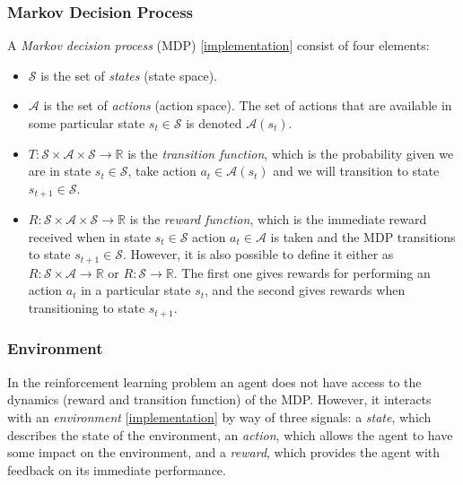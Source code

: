 \documentclass{article}
\newcommand{\GithubURL}[1]{[\href{https://github.com/davidrobles/mlnd-capstone-code/blob/master/#1}{implementation}]}
\begin{document}
\subsubsection{Markov Decision Process}

A \emph{Markov decision process} (MDP) \GithubURL{capstone/rl/mdp.py} consist of four elements:

\begin{itemize}

    \item $\mathcal{S}$ is the set of \emph{states} (state space).

    \item $\mathcal{A}$ is the set of \emph{actions} (action space). The set of actions that are
        available in some particular state $s_t \in \mathcal{S}$ is denoted $\mathcal{A}(s_t)$.

    \item $ T : \mathcal{S} \times \mathcal{A} \times \mathcal{S} \to \mathbb{R}$ is the
      \emph{transition function}, which is the probability given we are in state $s_t \in
      \mathcal{S}$, take action $a_t \in \mathcal{A}(s_t)$ and we will transition to state $s_{t+1}
      \in \mathcal{S}$.

    \item $ R : \mathcal{S} \times \mathcal{A} \times \mathcal{S} \to \mathbb{R}$ is the
      \emph{reward function}, which is the immediate reward received when in state $s_t \in
      \mathcal{S}$ action $a_t \in \mathcal{A}$ is taken and the MDP transitions to state $s_{t+1}
      \in \mathcal{S}$. However, it is also possible to define it either as $ R : \mathcal{S} \times
      \mathcal{A} \to \mathbb{R}$ or $R : \mathcal{S} \to \mathbb{R}$. The first one gives rewards
      for performing an action $a_t$ in a particular state $s_t$, and the second gives rewards when
      transitioning to state $s_{t+1}$.

\end{itemize}

\subsubsection{Environment}

In the reinforcement learning problem an agent does not have access to the dynamics (reward and
transition function) of the MDP. However, it interacts with an \emph{environment}
\GithubURL{capstone/rl/environment.py} by way of three signals: a \emph{state}, which describes the
state of the environment, an \emph{action}, which allows the agent to have some impact on the
environment, and a \emph{reward}, which provides the agent with feedback on its immediate
performance.
\end{document}
